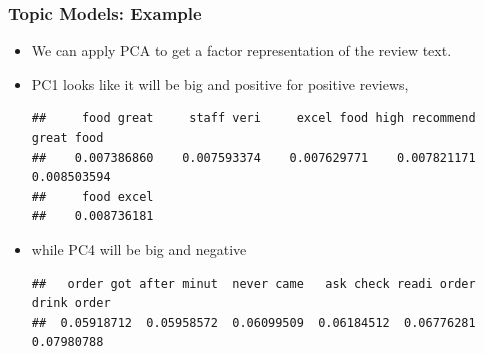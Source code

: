 \documentclass[
  shownotes,
  xcolor={svgnames},
  hyperref={colorlinks,citecolor=DarkBlue,linkcolor=DarkRed,urlcolor=DarkBlue}
  , aspectratio=169]{beamer}
\newenvironment{Shaded}{\begin{snugshade}}{\end{snugshade}}
\newcommand{\CommentTok}[1]{\textcolor[rgb]{0.56,0.35,0.01}{\textit{#1}}}
\newcommand{\DataTypeTok}[1]{\textcolor[rgb]{0.13,0.29,0.53}{#1}}
\newcommand{\DecValTok}[1]{\textcolor[rgb]{0.00,0.00,0.81}{#1}}
\newcommand{\KeywordTok}[1]{\textcolor[rgb]{0.13,0.29,0.53}{\textbf{#1}}}
\newcommand{\NormalTok}[1]{#1}
\newcommand{\OperatorTok}[1]{\textcolor[rgb]{0.81,0.36,0.00}{\textbf{#1}}}
\newcommand{\OtherTok}[1]{\textcolor[rgb]{0.56,0.35,0.01}{#1}}
\newcommand{\StringTok}[1]{\textcolor[rgb]{0.31,0.60,0.02}{#1}}
\begin{document}
\begin{frame}[fragile]
\frametitle{Topic Models: Example}

\begin{itemize}


\item We can apply PCA to get a factor representation of the review text. 
\item  PC1 looks like it will be big and positive for positive reviews, 

\begin{scriptsize}

\begin{Shaded}
\end{Shaded}

\end{scriptsize}
\begin{tiny}

\begin{verbatim}
##     food great     staff veri     excel food high recommend     great food 
##    0.007386860    0.007593374    0.007629771    0.007821171    0.008503594 
##     food excel 
##    0.008736181
\end{verbatim}

\end{tiny}
\medskip



\item while PC4 will be big and negative 
\begin{scriptsize}
\begin{Shaded}
\end{Shaded}
\end{scriptsize}
\begin{tiny}

\begin{verbatim}
##   order got after minut  never came   ask check readi order drink order 
##  0.05918712  0.05958572  0.06099509  0.06184512  0.06776281  0.07980788
\end{verbatim}
\end{tiny}




\end{itemize}
\end{frame}
\end{document}

